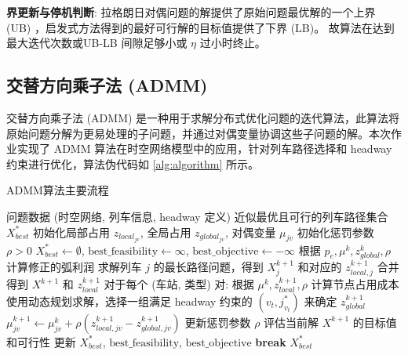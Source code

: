 \documentclass{article}
\begin{document}
\textbf{界更新与停机判断}:
拉格朗日对偶问题的解提供了原始问题最优解的一个上界 (UB) ，启发式方法得到的最好可行解的目标值提供了下界 (LB)。
故算法在达到最大迭代次数或UB-LB 间隙足够小或 $\eta$ 过小时终止。

\subsection{交替方向乘子法 (ADMM)}
交替方向乘子法 (ADMM)
是一种用于求解分布式优化问题的迭代算法，此算法将原始问题分解为更易处理的子问题，并通过对偶变量协调这些子问题的解。本次作业实现了 ADMM
算法在时空网络模型中的应用，针对列车路径选择和 headway 约束进行优化，算法伪代码如 \ref{alg:algorithm} 所示。

\begin{algorithm}[ht]
    \caption{ADMM算法主要流程}
    \begin{algorithmic}[1]
        \Require 问题数据 (时空网络, 列车信息, headway 定义)
        \Ensure 近似最优且可行的列车路径集合 $X_{best}^*$
        \State 初始化局部占用 $z_{local_{jv}}$, 全局占用 $z_{global_{jv}}$, 对偶变量 $\mu_{jv}$
        \State 初始化惩罚参数 $\rho > 0$
        \State $X_{best}^* \gets \emptyset$,
        $\text{best\_feasibility} \gets \infty$,
        $\text{best\_objective} \gets -\infty$
        \State {}
        \State 根据 $p_e, \mu^k, z_{global}^k, \rho$ 计算修正的弧利润
        \State 求解列车 $j$ 的最长路径问题，得到 $X_j^{k+1}$ 和对应的 $z_{local,j}^{k+1}$
        \EndFor
        \State 合并得到 $X^{k+1}$ 和 $z_{local}^{k+1}$
        \State {}
        \State 对于每个 (车站, 类型) 对:
        \State \quad 根据 $\mu^k, z_{local}^{k+1}, \rho$ 计算节点占用成本
        \State \quad 使用动态规划求解，选择一组满足 headway 约束的 $(v_t, j^*_{v_t})$
        来确定 $z_{global}^{k+1}$
        \State {}
        \State $\mu_{jv}^{k+1} \gets \mu_{jv}^k + \rho
        (z_{local,jv}^{k+1} - z_{global,jv}^{k+1})$
        \State 更新惩罚参数 $\rho$
        \State 评估当前解 $X^{k+1}$ 的目标值和可行性
        \State 更新 $X_{best}^*$, $\text{best\_feasibility}$,
        $\text{best\_objective}$
        \EndIf
        \State \textbf{break}
        \EndIf
        \EndFor
        \State \Return $X_{best}^*$
    \end{algorithmic}\label{alg:algorithm}
\end{algorithm}
\end{document}
